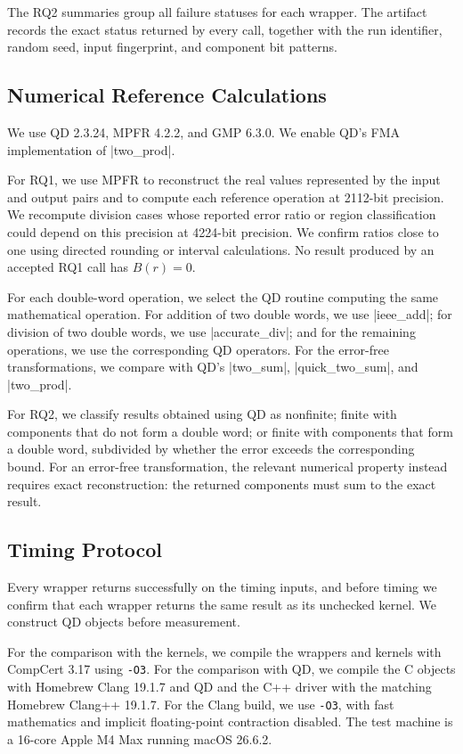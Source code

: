 The RQ2 summaries group all failure statuses for each wrapper. The artifact
records the exact status returned by every call, together with the run
identifier, random seed, input fingerprint, and component bit patterns.

\subsection{Numerical Reference Calculations}

We use QD 2.3.24, MPFR 4.2.2, and GMP 6.3.0. We enable QD's FMA
implementation of \ccode|two_prod|.

For RQ1, we use MPFR to reconstruct the real values represented by the input
and output pairs and to compute each reference operation at 2112-bit
precision. We recompute division cases whose reported error ratio or region
classification could depend on this precision at 4224-bit precision. We
confirm ratios close to one using directed rounding or interval calculations.
No result produced by an accepted RQ1 call has $B(r)=0$.

For each double-word operation, we select the QD routine computing the same
mathematical operation. For addition of two double words, we use
\ccode|ieee_add|; for division of two double words, we use
\ccode|accurate_div|; and for the remaining operations, we use the
corresponding QD operators. For the error-free transformations, we compare
with QD's
\ccode|two_sum|, \ccode|quick_two_sum|, and \ccode|two_prod|.

For RQ2, we classify results obtained using QD as nonfinite; finite with
components that do not form a double word; or finite with components that form
a double word, subdivided by whether the error exceeds the
corresponding \FenceDD{} bound. For an error-free transformation, the relevant
numerical property instead requires exact reconstruction: the returned
components must sum to the exact result.

\subsection{Timing Protocol}
\label{app:evaluation-timing}

Every wrapper returns successfully on the timing inputs, and before timing we
confirm that each wrapper returns the same result as its unchecked kernel. We
construct QD objects before measurement.

For the comparison with the kernels, we compile the \FenceDD{} wrappers and
kernels with CompCert 3.17 using \texttt{-O3}. For the comparison with QD, we
compile the \FenceDD{} C objects with Homebrew Clang 19.1.7 and QD and the C++
driver with the matching Homebrew Clang++ 19.1.7. For the Clang build, we use
\texttt{-O3}, with fast mathematics and implicit floating-point contraction
disabled. The test machine is a 16-core Apple M4 Max running macOS 26.6.2.

